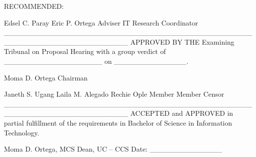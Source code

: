RECOMMENDED:

Edsel C. Paray	Eric  P. Ortega
      Adviser	IT Research Coordinator
________________________________________________________________________
APPROVED BY THE Examining Tribunal on Proposal Hearing with a group verdict of ___________________ on ______________.

Moma D. Ortega
Chairman

 Janeth S. Ugang	Laila M. Alegado	Rechie Ople
Member	Member	Censor
________________________________________________________________________
ACCEPTED and APPROVED in partial fulfillment of the requirements in Bachelor of Science in Information Technology.

Moma D. Ortega, MCS
                   Dean, UC – CCS
                                  Date: ______________

